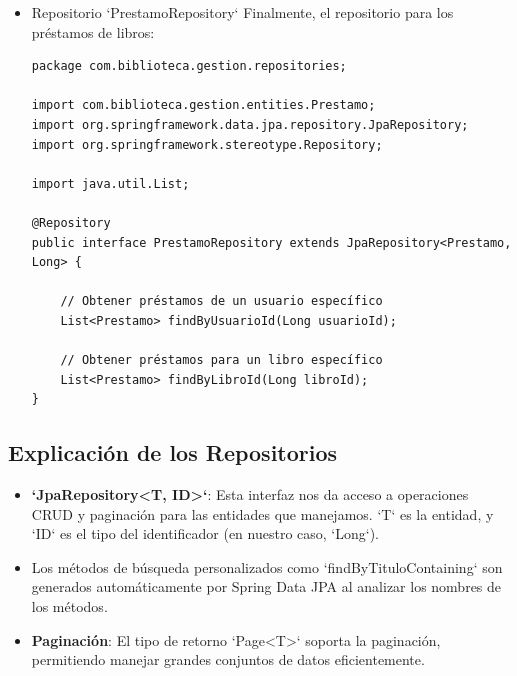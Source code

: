 \documentclass[11pt]{article}
\begin{document}
\begin{itemize}
\begin{verbatim}
package com.biblioteca.gestion.repositories;

import com.biblioteca.gestion.entities.Usuario;
import org.springframework.data.jpa.repository.JpaRepository;
import org.springframework.stereotype.Repository;

import java.util.Optional;

@Repository
public interface UsuarioRepository extends JpaRepository<Usuario, Long> {

    // Buscar usuario por correo electrónico
    Optional<Usuario> findByEmail(String email);
}
\end{verbatim}

\item Repositorio `PrestamoRepository`
\label{sec:org3ec911f}
Finalmente, el repositorio para los préstamos de libros:

\begin{verbatim}
package com.biblioteca.gestion.repositories;

import com.biblioteca.gestion.entities.Prestamo;
import org.springframework.data.jpa.repository.JpaRepository;
import org.springframework.stereotype.Repository;

import java.util.List;

@Repository
public interface PrestamoRepository extends JpaRepository<Prestamo, Long> {

    // Obtener préstamos de un usuario específico
    List<Prestamo> findByUsuarioId(Long usuarioId);

    // Obtener préstamos para un libro específico
    List<Prestamo> findByLibroId(Long libroId);
}
\end{verbatim}
\end{itemize}

\subsection{Explicación de los Repositorios}
\label{sec:orgf848aef}
\begin{itemize}
\item \textbf{\textbf{`JpaRepository<T, ID>`}}: Esta interfaz nos da acceso a
operaciones CRUD y paginación para las entidades que manejamos. `T`
es la entidad, y `ID` es el tipo del identificador (en nuestro caso,
`Long`).
\item Los métodos de búsqueda personalizados como `findByTituloContaining`
son generados automáticamente por Spring Data JPA al analizar los
nombres de los métodos.
\item \textbf{\textbf{Paginación}}: El tipo de retorno `Page<T>` soporta la paginación,
permitiendo manejar grandes conjuntos de datos eficientemente.
\end{itemize}
\end{document}
